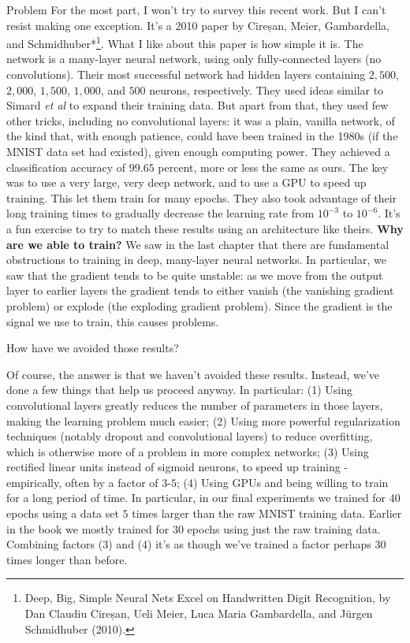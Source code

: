 \begin{exerciseBox}{Problem}
For the most part, I won't try to survey this recent work. But I can't resist making one exception. It's a 2010 paper by Cireșan, Meier, Gambardella, and Schmidhuber*\footnote{Deep, Big, Simple Neural Nets Excel on Handwritten Digit Recognition, by Dan Claudiu Cireșan, Ueli Meier, Luca Maria Gambardella, and Jürgen Schmidhuber (2010).}. What I like about this paper is how simple it is. The network is a many-layer neural network, using only fully-connected layers (no convolutions). Their most successful network had hidden layers containing $2,500$, $2,000$, $1,500$, $1,000$, and $500$ neurons, respectively. They used ideas similar to Simard \emph{et al} to expand their training data. But apart from that, they used few other tricks, including no convolutional layers: it was a plain, vanilla network, of the kind that, with enough patience, could have been trained in the 1980s (if the MNIST data set had existed), given enough computing power. They achieved a classification accuracy of $99.65$ percent, more or less the same as ours. The key was to use a very large, very deep network, and to use a GPU to speed up training. This let them train for many epochs. They also took advantage of their long training times to gradually decrease the learning rate from $10^{-3}$ to $10^{-6}$. It's a fun exercise to try to match these results using an architecture like theirs. \textbf{Why are we able to train?} We saw in the last chapter that there are fundamental obstructions to training in deep, many-layer neural networks. In particular, we saw that the gradient tends to be quite unstable: as we move from the output layer to earlier layers the gradient tends to either vanish (the vanishing gradient problem) or explode (the exploding gradient problem). Since the gradient is the signal we use to train, this causes problems.


How have we avoided those results?


Of course, the answer is that we haven't avoided these results. Instead, we've done a few things that help us proceed anyway. In particular: (1) Using convolutional layers greatly reduces the number of parameters in those layers, making the learning problem much easier; (2) Using more powerful regularization techniques (notably dropout and convolutional layers) to reduce overfitting, which is otherwise more of a problem in more complex networks; (3) Using rectified linear units instead of sigmoid neurons, to speed up training - empirically, often by a factor of $3$-$5$; (4) Using GPUs and being willing to train for a long period of time. In particular, in our final experiments we trained for $40$ epochs using a data set $5$ times larger than the raw MNIST training data. Earlier in the book we mostly trained for $30$ epochs using just the raw training data. Combining factors (3) and (4) it's as though we've trained a factor perhaps $30$ times longer than before.



\end{exerciseBox}
